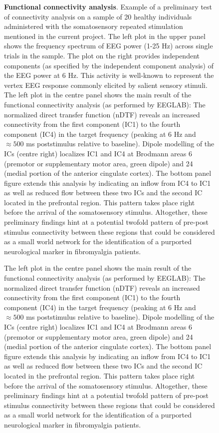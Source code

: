\documentclass[twocolumn,  rga,issue, numeric]{jote-new-article}
\begin{document}
\begin{figure}
  \caption{\textbf{Functional connectivity analysis}. Example of a preliminary test of connectivity analysis on a sample of 20 healthy individuals administered with the somatosensory repeated stimulation mentioned in the current project. The left plot in the upper panel shows the frequency spectrum of EEG power (1-25 Hz) across single trials in the sample. The plot on the right provides independent components (as specified by the independent component analysis) of the EEG power at 6 Hz. This activity is well-known to represent the vertex EEG response commonly elicited by salient sensory stimuli.
     The left plot in the centre panel shows the main result of the functional connectivity analysis (as performed by EEGLAB): The normalized direct transfer function (nDTF) reveals an increased connectivity from the first component (IC1) to the fourth component (IC4) in the target frequency (peaking at 6 Hz and $\approx500$ ms poststimulus relative to baseline). Dipole modelling of the ICs (centre right) localizes IC1 and IC4 at Brodmann areas 6 (premotor or supplementary motor area, green dipole) and 24 (medial portion of the anterior cingulate cortex). The bottom panel figure extends this analysis by indicating an inflow from IC4 to IC1 as well as reduced flow between these two ICs and the second IC located in the prefrontal region. This pattern takes place right before the arrival of the somatosensory stimulus. Altogether, these preliminary findings hint at a potential twofold pattern of pre-post stimulus connectivity between these regions that could be considered as a small world network for the identification of a purported neurological marker in fibromyalgia patients.}
    

  \end{figure}

\renewcommand{\thefigure}{\arabic{figure} (Cont.)}
\addtocounter{figure}{-1}
  \begin{figure}
\caption{
    The left plot in the centre panel shows the main result of the functional connectivity analysis (as performed by EEGLAB): The normalized direct transfer function (nDTF) reveals an increased connectivity from the first component (IC1) to the fourth component (IC4) in the target frequency (peaking at 6 Hz and $\approx500$ ms poststimulus relative to baseline). Dipole modelling of the ICs (centre right) localizes IC1 and IC4 at Brodmann areas 6 (premotor or supplementary motor area, green dipole) and 24 (medial portion of the anterior cingulate cortex). The bottom panel figure extends this analysis by indicating an inflow from IC4 to IC1 as well as reduced flow between these two ICs and the second IC located in the prefrontal region. This pattern takes place right before the arrival of the somatosensory stimulus. Altogether, these preliminary findings hint at a potential twofold pattern of pre-post stimulus connectivity between these regions that could be considered as a small world network for the identification of a purported neurological marker in fibromyalgia patients.
    }
    \end{figure}
\end{document}
